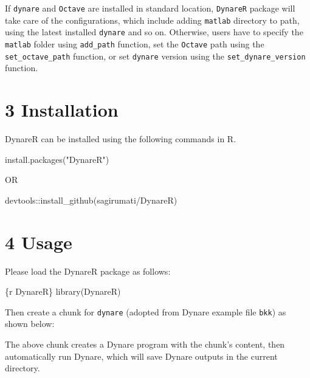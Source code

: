 \documentclass[
  letterpaper,
  DIV=11,
  numbers=noendperiod]{scrartcl}
\newenvironment{Shaded}{\begin{snugshade}}{\end{snugshade}}
\newcommand{\FunctionTok}[1]{\textcolor[rgb]{0.28,0.35,0.67}{#1}}
\newcommand{\InformationTok}[1]{\textcolor[rgb]{0.37,0.37,0.37}{#1}}
\newcommand{\NormalTok}[1]{\textcolor[rgb]{0.00,0.23,0.31}{#1}}
\newcommand{\SpecialCharTok}[1]{\textcolor[rgb]{0.37,0.37,0.37}{#1}}
\newcommand{\StringTok}[1]{\textcolor[rgb]{0.13,0.47,0.30}{#1}}
\begin{document}
If \texttt{dynare} and \texttt{Octave} are installed in standard
location, \texttt{DynareR} package will take care of the configurations,
which include adding \texttt{matlab} directory to path, using the latest
installed \texttt{dynare} and so on. Otherwise, users have to specify
the \texttt{matlab} folder using \texttt{add\_path} function, set the
\texttt{Octave} path using the \texttt{set\_octave\_path} function, or
set \texttt{dynare} version using the \texttt{set\_dynare\_version}
function.

\hypertarget{installation}{%
\section{3 Installation}\label{installation}}

DynareR can be installed using the following commands in R.

\begin{Shaded}
\begin{Highlighting}[]
\FunctionTok{install.packages}\NormalTok{(}\StringTok{"DynareR"}\NormalTok{)}

\NormalTok{          OR}
          
\NormalTok{devtools}\SpecialCharTok{::}\FunctionTok{install\_github}\NormalTok{(}\StringTok{\textquotesingle{}sagirumati/DynareR\textquotesingle{}}\NormalTok{)}
\end{Highlighting}
\end{Shaded}

\hypertarget{usage}{%
\section{4 Usage}\label{usage}}

Please load the DynareR package as follows:

\begin{Shaded}
\begin{Highlighting}[]
\InformationTok{\textasciigrave{}\textasciigrave{}\textasciigrave{}\{r DynareR\}}
\FunctionTok{library}\NormalTok{(DynareR)}
\InformationTok{\textasciigrave{}\textasciigrave{}\textasciigrave{}}
\end{Highlighting}
\end{Shaded}

Then create a chunk for \texttt{dynare} (adopted from Dynare example
file \texttt{bkk}) as shown below:

The above chunk creates a Dynare program with the chunk's content, then
automatically run Dynare, which will save Dynare outputs in the current
directory.
\end{document}
